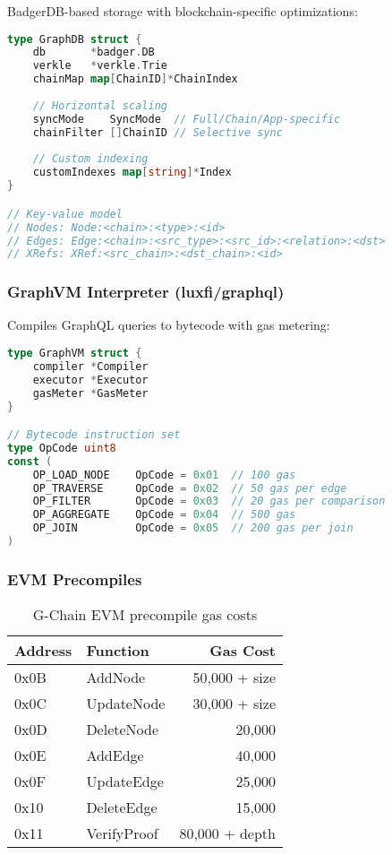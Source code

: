 \documentclass[11pt,a4paper]{article}
\begin{document}
BadgerDB-based storage with blockchain-specific optimizations:

\begin{lstlisting}[language=Go, basicstyle=\small\ttfamily]
type GraphDB struct {
    db       *badger.DB
    verkle   *verkle.Trie
    chainMap map[ChainID]*ChainIndex
    
    // Horizontal scaling
    syncMode    SyncMode  // Full/Chain/App-specific
    chainFilter []ChainID // Selective sync
    
    // Custom indexing
    customIndexes map[string]*Index
}

// Key-value model
// Nodes: Node:<chain>:<type>:<id>
// Edges: Edge:<chain>:<src_type>:<src_id>:<relation>:<dst>
// XRefs: XRef:<src_chain>:<dst_chain>:<id>
\end{lstlisting}

\subsubsection{GraphVM Interpreter (luxfi/graphql)}

Compiles GraphQL queries to bytecode with gas metering:

\begin{lstlisting}[language=Go, basicstyle=\small\ttfamily]
type GraphVM struct {
    compiler *Compiler
    executor *Executor
    gasMeter *GasMeter
}

// Bytecode instruction set
type OpCode uint8
const (
    OP_LOAD_NODE    OpCode = 0x01  // 100 gas
    OP_TRAVERSE     OpCode = 0x02  // 50 gas per edge
    OP_FILTER       OpCode = 0x03  // 20 gas per comparison
    OP_AGGREGATE    OpCode = 0x04  // 500 gas
    OP_JOIN         OpCode = 0x05  // 200 gas per join
)
\end{lstlisting}

\subsubsection{EVM Precompiles}

\begin{table}[h]
\centering
\begin{tabular}{@{}llr@{}}
\toprule
\textbf{Address} & \textbf{Function} & \textbf{Gas Cost} \\ \midrule
0x0B & AddNode & 50,000 + size \\
0x0C & UpdateNode & 30,000 + size \\
0x0D & DeleteNode & 20,000 \\
0x0E & AddEdge & 40,000 \\
0x0F & UpdateEdge & 25,000 \\
0x10 & DeleteEdge & 15,000 \\
0x11 & VerifyProof & 80,000 + depth \\ \bottomrule
\end{tabular}
\caption{G-Chain EVM precompile gas costs}
\end{table}
\end{document}
